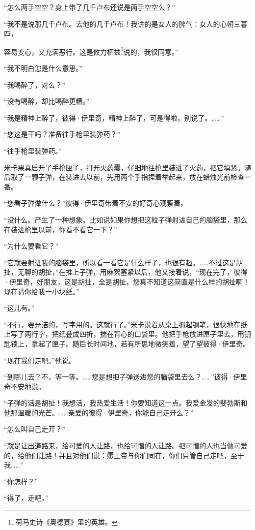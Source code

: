 \par “怎么两手空空？身上带了几千卢布还说是两手空空么？”
\par “我不是说那几千卢布。去他的几千卢布！我讲的是女人的脾气：女人的心朝三暮四，
\par 容易变心，又充满恶行。这是攸力栖兹\footnote{荷马史诗《奥德赛》里的英雄。}说的，我很同意。”
\par “我不明白您是什么意思。”
\par “我喝醉了，对么？”
\par “没有喝醉，却比喝醉更糟。”
\par “我是精神上醉了，彼得·伊里奇，精神上醉了，可是得啦，别说了。……”
\par “您这是干吗？准备往手枪里装弹药？”
\par “往手枪里装弹药。”
\par 米卡果真启开了手枪匣子，打开火药囊，仔细地往枪里装进了火药，把它填紧。随后取了一颗子弹，在装进去以前，先用两个手指捏着举起来，放在蜡烛光前检查一番。
\par “您看子弹做什么？”彼得·伊里奇带着不安的好奇心观察着。
\par “没什么。产生了一种想象。比如说如果你想把这粒子弹射进自己的脑袋里，那么在装进枪里以前，你看不看它一下？”
\par “为什么要看它？”
\par “它就要射进我的脑袋里，所以看一看它是什么样子，也很有趣。……不过这是胡扯，无聊的胡扯，”在推上子弹，用麻絮塞紧以后，他又接着说，“现在完了，彼得·伊里奇，好朋友，这是胡扯，全是胡扯，您真不知道这简直是什么样的胡扯啊！现在请你给我一小块纸。”
\par “这儿有。”
\par “不行，要光洁的，写字用的。这就行了。”米卡说着从桌上抓起钢笔，很快地在纸上写了两行字，把纸叠成四折，揣在背心的口袋里。他把手枪放进匣子里去，用钥匙锁上，拿起了匣子。随后长时间地，若有所思地微笑着，望了望彼得·伊里奇。
\par “现在我们走吧。”他说。
\par “到哪儿去？不，等一等。……您是想把子弹送进您的脑袋里去么？……”彼得·伊里奇不安地说。
\par “子弹的话是胡扯！我想活，我热爱生活！你要知道这一点。我爱金发的斐勃斯和他那温暖的光芒。……亲爱的彼得·伊里奇，你能自己走开么？”
\par “怎么叫自己走开？”
\par “就是让出道路来，给可爱的人让路，也给可憎的人让路。把可憎的人也当做可爱的，给他们让路！并且对他们说：愿上帝与你们同在，你们只管自己走吧，至于我……”
\par “你怎样？”
\par “得了，走吧。”
